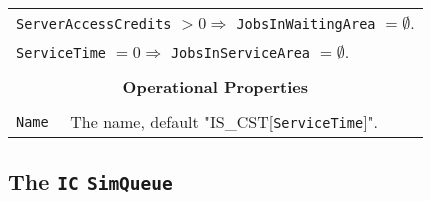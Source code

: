 \documentclass[12pt]{book}
\begin{document}
\begin{tabular}{|l|l|l|l|}
\multicolumn{4}{|l|}{\lstinline|ServerAccessCredits| $> 0 \Rightarrow$ \lstinline|JobsInWaitingArea| $= \emptyset$.} \\
\multicolumn{4}{|l|}{\lstinline|ServiceTime| $= 0 \Rightarrow$ \lstinline|JobsInServiceArea| $= \emptyset$.} \\
\hline
\multicolumn{4}{|c|}{} \\
\multicolumn{4}{|c|}{\bf Operational Properties} \\
\multicolumn{4}{|c|}{} \\
\hline
\lstinline|Name| & \multicolumn{3}{|l|}{The name, default "IS\_CST[\lstinline|ServiceTime|]".} \\
\hline
\end{tabular}

\subsection{The \lstinline{IC} \lstinline{SimQueue}}
\end{document}
